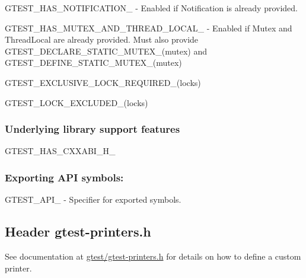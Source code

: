 \begin{DoxyItemize}
\item {\ttfamily G\+T\+E\+S\+T\+\_\+\+H\+A\+S\+\_\+\+N\+O\+T\+I\+F\+I\+C\+A\+T\+I\+O\+N\+\_\+} -\/ Enabled if Notification is already provided.
\item {\ttfamily G\+T\+E\+S\+T\+\_\+\+H\+A\+S\+\_\+\+M\+U\+T\+E\+X\+\_\+\+A\+N\+D\+\_\+\+T\+H\+R\+E\+A\+D\+\_\+\+L\+O\+C\+A\+L\+\_\+} -\/ Enabled if {\ttfamily Mutex} and {\ttfamily Thread\+Local} are already provided. Must also provide {\ttfamily G\+T\+E\+S\+T\+\_\+\+D\+E\+C\+L\+A\+R\+E\+\_\+\+S\+T\+A\+T\+I\+C\+\_\+\+M\+U\+T\+E\+X\+\_\+(mutex)} and {\ttfamily G\+T\+E\+S\+T\+\_\+\+D\+E\+F\+I\+N\+E\+\_\+\+S\+T\+A\+T\+I\+C\+\_\+\+M\+U\+T\+E\+X\+\_\+(mutex)}
\item {\ttfamily G\+T\+E\+S\+T\+\_\+\+E\+X\+C\+L\+U\+S\+I\+V\+E\+\_\+\+L\+O\+C\+K\+\_\+\+R\+E\+Q\+U\+I\+R\+E\+D\+\_\+(locks)}
\item {\ttfamily G\+T\+E\+S\+T\+\_\+\+L\+O\+C\+K\+\_\+\+E\+X\+C\+L\+U\+D\+E\+D\+\_\+(locks)}
\end{DoxyItemize}

\subsubsection*{Underlying library support features}


\begin{DoxyItemize}
\item {\ttfamily G\+T\+E\+S\+T\+\_\+\+H\+A\+S\+\_\+\+C\+X\+X\+A\+B\+I\+\_\+\+H\+\_\+}
\end{DoxyItemize}

\subsubsection*{Exporting A\+PI symbols\+:}


\begin{DoxyItemize}
\item {\ttfamily G\+T\+E\+S\+T\+\_\+\+A\+P\+I\+\_\+} -\/ Specifier for exported symbols.
\end{DoxyItemize}

\subsection*{Header {\ttfamily gtest-\/printers.\+h}}


\begin{DoxyItemize}
\item See documentation at {\ttfamily \mbox{\hyperlink{gtest-printers_8h_source}{gtest/gtest-\/printers.\+h}}} for details on how to define a custom printer. 
\end{DoxyItemize}